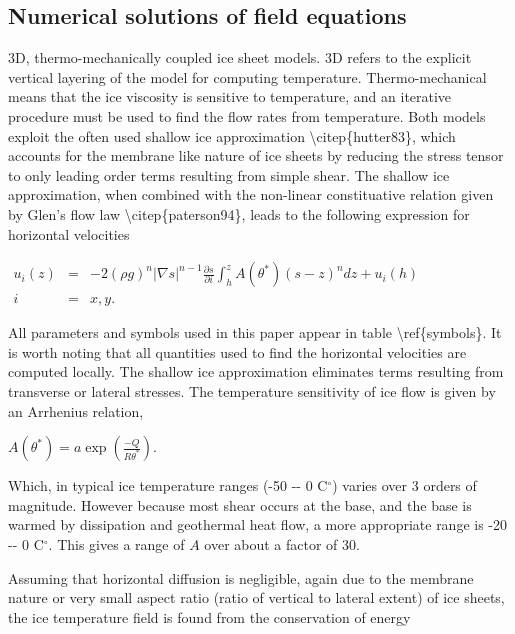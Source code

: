





\subsection{Numerical solutions of field equations}

3D, thermo-mechanically coupled ice sheet models. 3D refers to the
explicit vertical layering of the model for computing temperature.
Thermo-mechanical means that the ice viscosity is sensitive to
temperature, and an iterative procedure must be used to find the flow
rates from temperature. Both models exploit the often used shallow ice
approximation \textbackslash{}citep\{hutter83\}, which accounts for the
membrane like nature of ice sheets by reducing the stress tensor to only
leading order terms resulting from simple shear. The shallow ice
approximation, when combined with the non-linear constituative relation
given by Glen's flow law \textbackslash{}citep\{paterson94\}, leads to
the following expression for horizontal velocities

$\begin{matrix}
u_i(z) &=& -2 (\rho g)^n \vert \nabla s\vert ^{n-1} \frac{\partial s}{\partial i} 
\int_h^z A(\theta^*)(s-z)^n dz + u_i(h)\\
i &=& x,y.
\end{matrix}$

All parameters and symbols used in this paper appear in table
\textbackslash{}ref\{symbols\}. It is worth noting that all quantities
used to find the horizontal velocities are computed locally. The shallow
ice approximation eliminates terms resulting from transverse or lateral
stresses. The temperature sensitivity of ice flow is given by an
Arrhenius relation,

$
A(\theta^*) = a \exp \left(\frac{-Q}{R\theta^*}\right).
$

Which, in typical ice temperature ranges (-50 -{}- 0 C$^\circ$) varies
over 3 orders of magnitude. However because most shear occurs at the
base, and the base is warmed by dissipation and geothermal heat flow, a
more appropriate range is -20 -{}- 0 C$^\circ$. This gives a range of
$A$ over about a factor of 30.

Assuming that horizontal diffusion is negligible, again due to the
membrane nature or very small aspect ratio (ratio of vertical to lateral
extent) of ice sheets, the ice temperature field is found from the
conservation of energy

